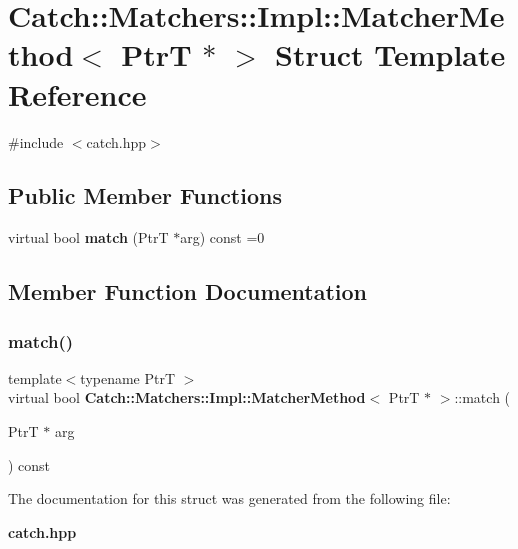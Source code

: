 \section{Catch\+:\+:Matchers\+:\+:Impl\+:\+:Matcher\+Method$<$ PtrT $\ast$ $>$ Struct Template Reference}
\label{struct_catch_1_1_matchers_1_1_impl_1_1_matcher_method_3_01_ptr_t_01_5_01_4}


{\ttfamily \#include $<$catch.\+hpp$>$}

\subsection*{Public Member Functions}
\begin{DoxyCompactItemize}
\item 
virtual bool \textbf{ match} (PtrT $\ast$arg) const =0
\end{DoxyCompactItemize}


\subsection{Member Function Documentation}
\mbox{\label{struct_catch_1_1_matchers_1_1_impl_1_1_matcher_method_3_01_ptr_t_01_5_01_4_a5fdd64f9509724f32ffc73cb320181d1}} 
\subsubsection{match()}
{\footnotesize\ttfamily template$<$typename PtrT $>$ \\
virtual bool \textbf{ Catch\+::\+Matchers\+::\+Impl\+::\+Matcher\+Method}$<$ PtrT $\ast$ $>$\+::match (\begin{DoxyParamCaption}\item[{PtrT $\ast$}]{arg }\end{DoxyParamCaption}) const\hspace{0.3cm}{\ttfamily [pure virtual]}}



The documentation for this struct was generated from the following file\+:\begin{DoxyCompactItemize}
\item 
\textbf{ catch.\+hpp}\end{DoxyCompactItemize}
